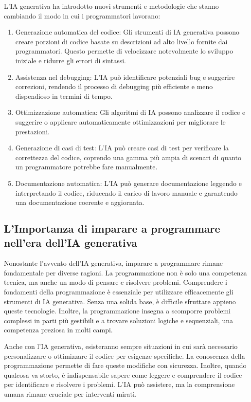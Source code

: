 \documentclass[
  letterpaper,
  DIV=11,
  numbers=noendperiod]{scrreprt}
\providecommand{\tightlist}{%
  \setlength{\itemsep}{0pt}\setlength{\parskip}{0pt}}\usepackage{longtable,booktabs,array}
\begin{document}
L'IA generativa ha introdotto nuovi strumenti e metodologie che stanno
cambiando il modo in cui i programmatori lavorano:

\begin{enumerate}
\def\labelenumi{\arabic{enumi}.}
\tightlist
\item
  Generazione automatica del codice: Gli strumenti di IA generativa
  possono creare porzioni di codice basate su descrizioni ad alto
  livello fornite dai programmatori. Questo permette di velocizzare
  notevolmente lo sviluppo iniziale e ridurre gli errori di sintassi.
\item
  Assistenza nel debugging: L'IA può identificare potenziali bug e
  suggerire correzioni, rendendo il processo di debugging più efficiente
  e meno dispendioso in termini di tempo.
\item
  Ottimizzazione automatica: Gli algoritmi di IA possono analizzare il
  codice e suggerire o applicare automaticamente ottimizzazioni per
  migliorare le prestazioni.
\item
  Generazione di casi di test: L'IA può creare casi di test per
  verificare la correttezza del codice, coprendo una gamma più ampia di
  scenari di quanto un programmatore potrebbe fare manualmente.
\item
  Documentazione automatica: L'IA può generare documentazione leggendo e
  interpretando il codice, riducendo il carico di lavoro manuale e
  garantendo una documentazione coerente e aggiornata.
\end{enumerate}

\subsection{L'Importanza di imparare a programmare nell'era dell'IA
generativa}\label{limportanza-di-imparare-a-programmare-nellera-dellia-generativa}

Nonostante l'avvento dell'IA generativa, imparare a programmare rimane
fondamentale per diverse ragioni. La programmazione non è solo una
competenza tecnica, ma anche un modo di pensare e risolvere problemi.
Comprendere i fondamenti della programmazione è essenziale per
utilizzare efficacemente gli strumenti di IA generativa. Senza una
solida base, è difficile sfruttare appieno queste tecnologie. Inoltre,
la programmazione insegna a scomporre problemi complessi in parti più
gestibili e a trovare soluzioni logiche e sequenziali, una competenza
preziosa in molti campi.

Anche con l'IA generativa, esisteranno sempre situazioni in cui sarà
necessario personalizzare o ottimizzare il codice per esigenze
specifiche. La conoscenza della programmazione permette di fare queste
modifiche con sicurezza. Inoltre, quando qualcosa va storto, è
indispensabile sapere come leggere e comprendere il codice per
identificare e risolvere i problemi. L'IA può assistere, ma la
comprensione umana rimane cruciale per interventi mirati.
\end{document}

